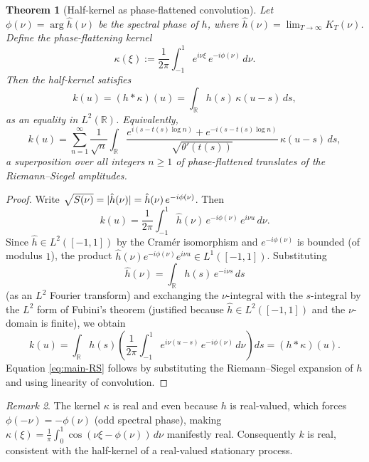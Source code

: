 \documentclass[11pt,reqno]{amsart}
\newtheorem{theorem}{Theorem}[section]
\theoremstyle{definition}
\theoremstyle{remark}
\newtheorem{remark}[theorem]{Remark}
\DeclarePairedDelimiter{\abs}{\lvert}{\rvert}
\begin{document}
\begin{theorem}[Half-kernel as phase-flattened convolution]\label{thm:main}
Let \(\phi(\nu) = \arg \hat{h}(\nu)\) be the spectral phase of \(h\), where
\(\hat{h}(\nu) = \lim_{T\to\infty} K_T(\nu)\). Define the
\emph{phase-flattening kernel}
\[
  \kappa(\xi) := \frac{1}{2\pi}\int_{-1}^{1} e^{i\nu\xi}\,e^{-i\phi(\nu)}\,d\nu.
\]
Then the half-kernel satisfies
\begin{equation}\label{eq:main}
  k(u) = (h * \kappa)(u) = \int_{\mathbb{R}} h(s)\,\kappa(u-s)\,ds,
\end{equation}
as an equality in \(L^2(\mathbb{R})\). Equivalently,
\begin{equation}\label{eq:main-RS}
  k(u) = \sum_{n=1}^{\infty} \frac{1}{\sqrt{n}}
  \int_{\mathbb{R}}
  \frac{e^{i(s-t(s)\log n)}+e^{-i(s-t(s)\log n)}}{\sqrt{\theta'(t(s))}}
  \,\kappa(u-s)\,ds,
\end{equation}
a superposition over all integers \(n\geq 1\) of phase-flattened
translates of the Riemann--Siegel amplitudes.
\end{theorem}

\begin{proof}
Write \(\sqrt{S(\nu)} = \abs{\hat{h}(\nu)} = \hat{h}(\nu)\,e^{-i\phi(\nu)}\).
Then
\[
  k(u) = \frac{1}{2\pi}\int_{-1}^{1} \hat{h}(\nu)\,e^{-i\phi(\nu)}\,e^{i\nu u}\,d\nu.
\]
Since \(\hat{h}\in L^2([-1,1])\) by the Cram\'{e}r isomorphism and
\(e^{-i\phi(\nu)}\) is bounded (of modulus \(1\)), the product
\(\hat{h}(\nu)e^{-i\phi(\nu)}e^{i\nu u}\in L^1([-1,1])\). Substituting
\[
  \hat{h}(\nu) = \int_{\mathbb{R}} h(s)\,e^{-i\nu s}\,ds
\]
(as an \(L^2\) Fourier transform) and exchanging the \(\nu\)-integral
with the \(s\)-integral by the \(L^2\) form of Fubini's theorem
(justified because \(\hat{h}\in L^2([-1,1])\) and the \(\nu\)-domain
is finite), we obtain
\[
  k(u)
  = \int_{\mathbb{R}} h(s)
    \left(\frac{1}{2\pi}\int_{-1}^{1} e^{i\nu(u-s)}\,e^{-i\phi(\nu)}\,d\nu\right)ds
  = (h * \kappa)(u).
\]
Equation \eqref{eq:main-RS} follows by substituting the Riemann--Siegel
expansion of \(h\) and using linearity of convolution.
\end{proof}

\begin{remark}
The kernel \(\kappa\) is real and even because \(h\) is real-valued,
which forces \(\phi(-\nu)=-\phi(\nu)\) (odd spectral phase), making
\(\kappa(\xi)=\frac{1}{\pi}\int_0^1\cos(\nu\xi-\phi(\nu))\,d\nu\) manifestly real.
Consequently \(k\) is real, consistent with the half-kernel of a
real-valued stationary process.
\end{remark}
\end{document}
